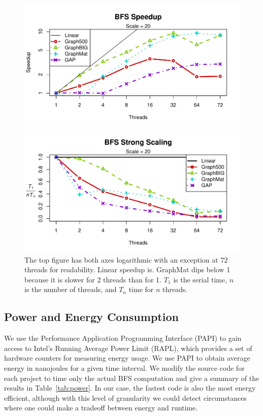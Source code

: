 \documentclass{llncs}
\begin{document}
\begin{figure}
	\centering
	\begin{minipage}{0.9\linewidth}
		\includegraphics[width=\linewidth, trim=0 18pt 18pt 12pt, clip]{graphics/bfs_speedup.pdf}
	\end{minipage}
	\begin{minipage}{0.9\linewidth}
		\includegraphics[width=\linewidth, trim=0 18pt 18pt 12pt, clip]{graphics/bfs_ss.pdf}
	\end{minipage}
	\caption{The top figure has both axes logarithmic with an exception at 72 threads for readability. Linear speedup is. GraphMat dips below 1 because it is slower for $2$ threads than for 1. $T_1$ is the serial time, $n$ is the number of threads, and $T_n$ time for $n$ threads.}
	\label{fig:bfs-scaling}
\end{figure}

\subsection{Power and Energy Consumption}
We use the Performance Application Programming Interface (PAPI) \cite{Browne:2000:PAPI} to gain access to Intel's Running Average Power Limit (RAPL), which provides a set of hardware counters for measuring energy usage. We use PAPI to obtain average energy in nanojoules for a given time interval. We modify the source code for each project to time only the actual BFS computation and give a summary of the results in Table~\ref{tab:power}. In our case, the fastest code is also the most energy efficient, although with this level of granularity we could detect circumstances where one could make a tradeoff between energy and runtime.
\end{document}
